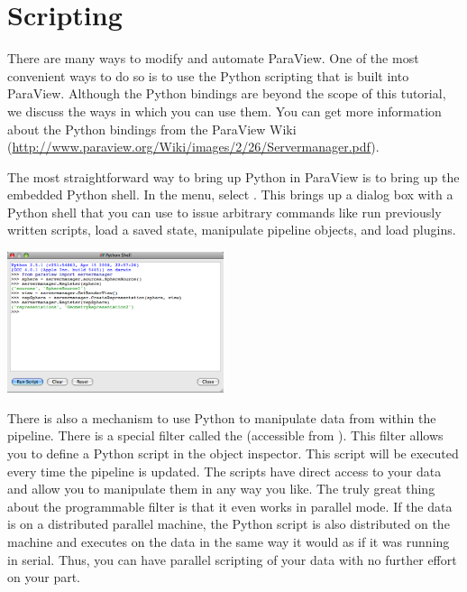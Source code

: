 \section{Scripting}

There are many ways to modify and automate ParaView.  One of the most
convenient ways to do so is to use the Python scripting that is built into
ParaView.  Although the Python bindings are beyond the scope of this
tutorial, we discuss the ways in which you can use them.  You can get more
information about the Python bindings from the ParaView Wiki
(\href{http://www.paraview.org/Wiki/images/2/26/Servermanager.pdf}{http://www.paraview.org/Wiki/images/2/26/Servermanager.pdf}).

The most straightforward way to bring up Python in ParaView is to bring up
the embedded Python shell.  In the menu, select  \ra {}.  This brings up a dialog box with a Python shell that you can use
to issue arbitrary commands like run previously written scripts, load a
saved state, manipulate pipeline objects, and load plugins.

\begin{inlinefig}
  \includegraphics[width=2.5in]{images/PythonShell}
\end{inlinefig}

There is also a mechanism to use Python to manipulate data from within the
pipeline.  There is a special filter called the  (accessible from  \ra {} \ra
{}).  This filter allows you to define a Python
script in the object inspector.  This script will be executed every time
the pipeline is updated.  The scripts have direct access to your data and
allow you to manipulate them in any way you like.  The truly great thing
about the programmable filter is that it even works in parallel mode.  If
the data is on a distributed parallel machine, the Python script is also
distributed on the machine and executes on the data in the same way it
would as if it was running in serial.  Thus, you can have parallel
scripting of your data with no further effort on your part.

